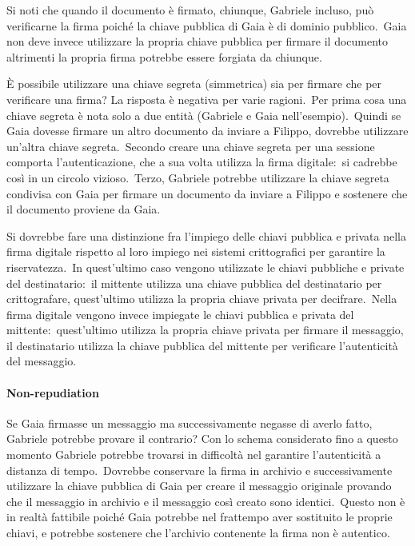 Si noti che quando il documento è firmato, chiunque, Gabriele incluso, può verificarne la firma poiché la chiave pubblica di Gaia è di dominio pubblico.\
Gaia non deve invece utilizzare la propria chiave pubblica per firmare il documento altrimenti la propria firma potrebbe essere forgiata da chiunque.

È possibile utilizzare una chiave segreta (simmetrica) sia per firmare che per verificare una firma? La risposta è negativa per varie ragioni.\
Per prima cosa una chiave segreta è nota solo a due entità (Gabriele e Gaia nell'esempio).\
Quindi se Gaia dovesse firmare un altro documento da inviare a Filippo, dovrebbe utilizzare un'altra chiave segreta.\
Secondo creare una chiave segreta per una sessione comporta l'autenticazione, che a sua volta utilizza la firma digitale:\ si cadrebbe così in un circolo vizioso.\
Terzo, Gabriele potrebbe utilizzare la chiave segreta condivisa con Gaia per firmare un documento da inviare a Filippo e sostenere che il documento proviene da Gaia.

Si dovrebbe fare una distinzione fra l'impiego delle chiavi pubblica e privata nella firma digitale rispetto al loro impiego nei sistemi crittografici per garantire la riservatezza.\
In quest'ultimo caso vengono utilizzate le chiavi pubbliche e private del destinatario:\ il mittente utilizza una chiave pubblica del destinatario per crittografare, quest'ultimo utilizza la propria chiave privata per decifrare.\
Nella firma digitale vengono invece impiegate le chiavi pubblica e privata del mittente:\ quest'ultimo utilizza la propria chiave privata per firmare il messaggio, il destinatario utilizza la chiave pubblica del mittente per verificare l'autenticità del messaggio.

\paragraph{Non-repudiation} Se Gaia firmasse un messaggio ma successivamente negasse di averlo fatto, Gabriele potrebbe provare il contrario? Con lo schema considerato fino a questo momento Gabriele potrebbe trovarsi in difficoltà nel garantire l'autenticità a distanza di tempo.\
Dovrebbe conservare la firma in archivio e successivamente utilizzare la chiave pubblica di Gaia per creare il messaggio originale provando che il messaggio in archivio e il messaggio così creato sono identici.\
Questo non è in realtà fattibile poiché Gaia potrebbe nel frattempo aver sostituito le proprie chiavi, e potrebbe sostenere che l'archivio contenente la firma non è autentico.

